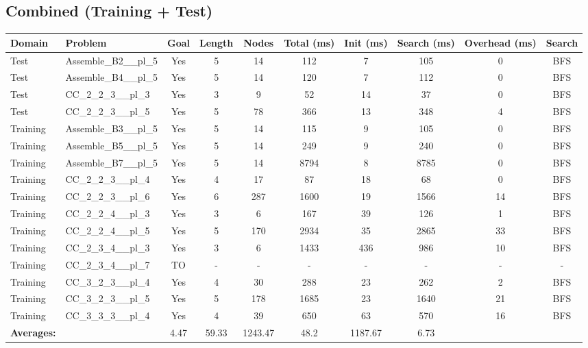 \documentclass{article}
\begin{document}
\subsection*{Combined (Training + Test)}
\begin{landscape}
\begin{tabular}{llcccccccc}
\toprule
Domain & Problem & Goal & Length & Nodes & Total (ms) & Init (ms) & Search (ms) & Overhead (ms) & Search \\
\midrule
Test & Assemble\_B2\_\_pl\_5 & Yes & 5 & 14 & 112 & 7 & 105 & 0 & BFS \\
Test & Assemble\_B4\_\_pl\_5 & Yes & 5 & 14 & 120 & 7 & 112 & 0 & BFS \\
Test & CC\_2\_2\_3\_\_pl\_3 & Yes & 3 & 9 & 52 & 14 & 37 & 0 & BFS \\
Test & CC\_2\_2\_3\_\_pl\_5 & Yes & 5 & 78 & 366 & 13 & 348 & 4 & BFS \\
Training & Assemble\_B3\_\_pl\_5 & Yes & 5 & 14 & 115 & 9 & 105 & 0 & BFS \\
Training & Assemble\_B5\_\_pl\_5 & Yes & 5 & 14 & 249 & 9 & 240 & 0 & BFS \\
Training & Assemble\_B7\_\_pl\_5 & Yes & 5 & 14 & 8794 & 8 & 8785 & 0 & BFS \\
Training & CC\_2\_2\_3\_\_pl\_4 & Yes & 4 & 17 & 87 & 18 & 68 & 0 & BFS \\
Training & CC\_2\_2\_3\_\_pl\_6 & Yes & 6 & 287 & 1600 & 19 & 1566 & 14 & BFS \\
Training & CC\_2\_2\_4\_\_pl\_3 & Yes & 3 & 6 & 167 & 39 & 126 & 1 & BFS \\
Training & CC\_2\_2\_4\_\_pl\_5 & Yes & 5 & 170 & 2934 & 35 & 2865 & 33 & BFS \\
Training & CC\_2\_3\_4\_\_pl\_3 & Yes & 3 & 6 & 1433 & 436 & 986 & 10 & BFS \\
Training & CC\_2\_3\_4\_\_pl\_7 & TO & - & - & - & - & - & - & - \\
Training & CC\_3\_2\_3\_\_pl\_4 & Yes & 4 & 30 & 288 & 23 & 262 & 2 & BFS \\
Training & CC\_3\_2\_3\_\_pl\_5 & Yes & 5 & 178 & 1685 & 23 & 1640 & 21 & BFS \\
Training & CC\_3\_3\_3\_\_pl\_4 & Yes & 4 & 39 & 650 & 63 & 570 & 16 & BFS \\
\textbf{Averages:} & & 4.47 & 59.33 & 1243.47 & 48.2 & 1187.67 & 6.73 & \\
\bottomrule
\end{tabular}
\end{landscape}
\newpage
\end{document}
